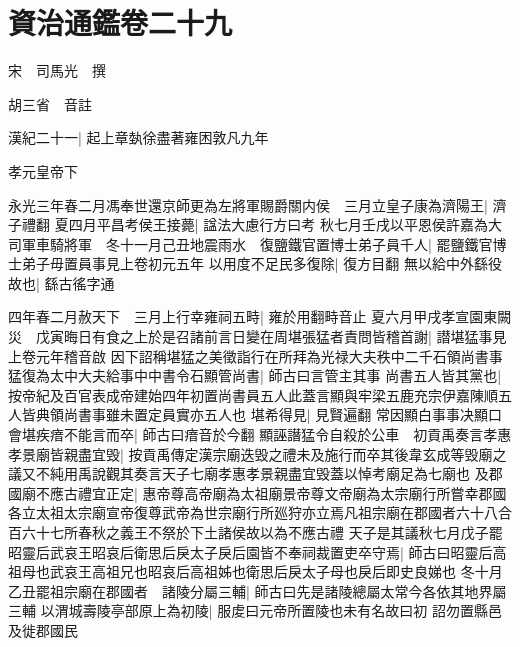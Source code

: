 \chapter{資治通鑑卷二十九}
宋　司馬光　撰

胡三省　音註

漢紀二十一|{
	起上章埶徐盡著雍困敦凡九年}


孝元皇帝下

永光三年春二月馮奉世還京師更為左將軍賜爵關内侯　三月立皇子康為濟陽王|{
	濟子禮翻}
夏四月平昌考侯王接薨|{
	諡法大慮行方曰考}
秋七月壬戌以平恩侯許嘉為大司軍車騎將軍　冬十一月己丑地震雨水　復鹽鐵官置博士弟子員千人|{
	罷鹽鐵官博士弟子毋置員事見上卷初元五年}
以用度不足民多復除|{
	復方目翻}
無以給中外繇役故也|{
	繇古徭字通}


四年春二月赦天下　三月上行幸雍祠五畤|{
	雍於用翻畤音止}
夏六月甲戌孝宣園東闕災　戊寅晦日有食之上於是召諸前言日變在周堪張猛者責問皆稽首謝|{
	譛堪猛事見上卷元年稽音啟}
因下詔稱堪猛之美徵詣行在所拜為光禄大夫秩中二千石領尚書事猛復為太中大夫給事中中書令石顯管尚書|{
	師古曰言管主其事}
尚書五人皆其黨也|{
	按帝紀及百官表成帝建始四年初置尚書員五人此蓋言顯與牢梁五鹿充宗伊嘉陳順五人皆典領尚書事雖未置定員實亦五人也}
堪希得見|{
	見賢遍翻}
常因顯白事事决顯口會堪疾瘖不能言而卒|{
	師古曰瘖音於今翻}
顯誣譖猛令自殺於公車　初貢禹奏言孝惠孝景廟皆親盡宜毁|{
	按貢禹傳定漢宗廟迭毁之禮未及施行而卒其後韋玄成等毁廟之議又不純用禹說觀其奏言天子七廟孝惠孝景親盡宜毁蓋以悼考廟足為七廟也}
及郡國廟不應古禮宜正定|{
	惠帝尊高帝廟為太祖廟景帝尊文帝廟為太宗廟行所嘗幸郡國各立太祖太宗廟宣帝復尊武帝為世宗廟行所廵狩亦立焉凡祖宗廟在郡國者六十八合百六十七所春秋之義王不祭於下土諸侯故以為不應古禮}
天子是其議秋七月戊子罷昭靈后武哀王昭哀后衛思后戾太子戾后園皆不奉祠裁置吏卒守焉|{
	師古曰昭靈后高祖母也武哀王高祖兄也昭哀后高祖姊也衛思后戾太子母也戾后即史良娣也}
冬十月乙丑罷祖宗廟在郡國者　諸陵分屬三輔|{
	師古曰先是諸陵總屬太常今各依其地界屬三輔}
以渭城壽陵亭部原上為初陵|{
	服䖍曰元帝所置陵也未有名故曰初}
詔勿置縣邑及徙郡國民

